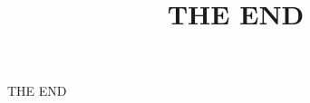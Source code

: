 \documentclass{article}
\title{THE END}
\begin{document}
		\maketitle
		\newpage
		THE END
	
\end{document}
